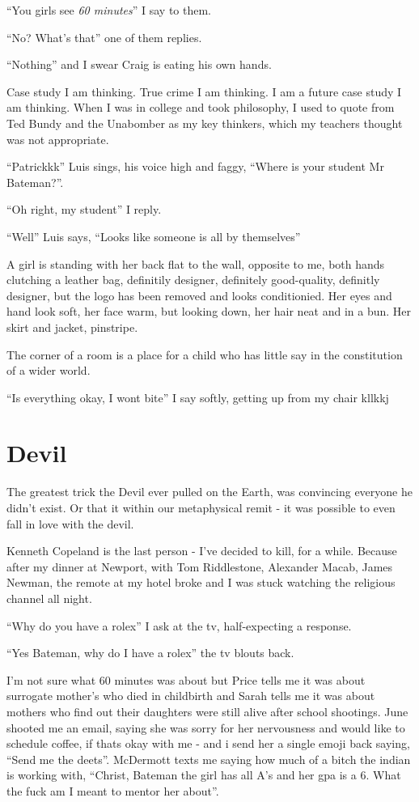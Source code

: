\documentclass[19pt,openany]{book}
\begin{document}
``You girls see \textit{60 minutes}'' I say to them.

``No? What's that'' one of them replies.

``Nothing'' and I swear Craig is eating his own hands.

Case study I am thinking. True crime I am thinking. I am a future
case study I am thinking. When I was in college and took philosophy,
I used to quote from Ted Bundy and the Unabomber as my key thinkers,
which my teachers thought was not appropriate.

``Patrickkk'' Luis sings, his voice
high and faggy, ``Where is your student Mr Bateman?''.

``Oh right, my student'' I reply.

``Well'' Luis says, ``Looks like someone is all by themselves''

A girl is standing with her back flat to the wall, opposite to me,
both hands clutching a leather bag, definitily designer, definitely
good-quality, definitly designer, but the logo has been removed and
looks conditionied. Her eyes and hand look soft, her face warm, but
looking down, her hair neat and in a bun. Her skirt and jacket, pinstripe.

The corner of a room is a place
for a child who has little say in the constitution of a wider world.

``Is everything okay, I wont bite'' I say softly, getting up from
my chair kllkkj

\chapter{Devil}
The greatest trick the Devil ever pulled on the Earth, was convincing everyone he didn't exist.
Or that it within our metaphysical remit - it was possible to even fall in love with the devil.

Kenneth Copeland is the last person - I've decided to kill, for a while. Because after
my dinner at Newport, with Tom Riddlestone, Alexander Macab, James Newman, the remote
at my hotel broke and I was stuck watching the religious channel all night.

``Why do you have a rolex'' I ask at the tv, half-expecting a response.

``Yes Bateman, why do I have a rolex'' the tv blouts back.

I'm not sure what 60 minutes was about but Price tells me it was about surrogate mother's who
died in childbirth and Sarah tells me it was about mothers who find out their
daughters were still alive after school shootings. June shooted me an email, saying
she was sorry for her nervousness and would like to schedule coffee, if thats okay with me -
and i send her a single emoji back saying, ``Send me the deets''. McDermott texts me saying
how much of a bitch the indian is working with, ``Christ, Bateman the girl has all A's and her
gpa is a 6. What the fuck am I meant to mentor her about''.
\end{document}
